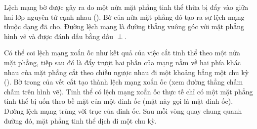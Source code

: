 Lệch mạng bờ được gây ra do một nửa mặt phẳng tinh thể thừa bị đẩy vào giữa hai lớp nguyên tử cạnh nhau (). Bờ của nửa mặt phẳng đó tạo ra sự lệch mạng thuộc dạng đã cho. Đường lệch mạng là đường thẳng vuông góc với mặt phẳng hình vẽ và được đánh dấu bằng dấu $\perp$.


Có thể coi lệch mạng xoắn ốc như kết quả của việc cắt tinh thể theo một nửa mặt phẳng, tiếp sau đó là đẩy trượt hai phần của mạng nằm về hai phía khác nhau của mặt phẳng cắt theo chiều ngược nhau đi một khoảng bẳng một chu kỳ (). Bờ trong của vết cắt tạo thành lệch mạng xoắn ốc (xem đường thẳng chấm chấm trên hình vẽ). Tinh thể có lệch mạng xoắn ốc thực tế chỉ có một mặt phẳng tinh thể bị uốn theo bề mặt của một đinh ốc (mặt này gọi là mặt đinh ốc). Đường lệch mạng trùng với trục của đinh ốc. Sau mỗi vòng quay chung quanh đường đó, mặt phẳng tinh thể dịch đi một chu kỳ. 

